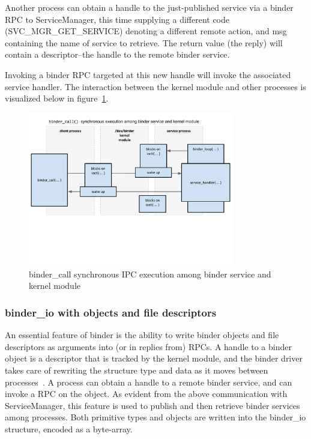 \documentclass[prodmode]{acmlarge}
\begin{document}
Another process can obtain a handle to the just-published service via a binder RPC to ServiceManager, this time supplying a different code (SVC\_MGR\_GET\_SERVICE) denoting a different remote action, and msg containing the name of service to retrieve. The return value (the reply) will contain a descriptor--the handle to the remote binder service.

Invoking a binder RPC targeted at this new handle will invoke the associated service handler. The interaction between the kernel module and other processes is visualized below in figure~\ref{fig:binder_call}.

\begin{figure}[h]
\centering
\includegraphics[width=0.8\textwidth]{drawings/binder_call.pdf}
\caption{binder\_call synchronous IPC execution among binder service and kernel module}
\label{fig:binder_call}
\end{figure}

\subsubsection{binder\_io with objects and file descriptors}
An essential feature of binder is the ability to write binder objects and file descriptors as arguments into (or in replies from) RPCs. A handle to a binder object is a descriptor that is tracked by the kernel module, and the binder driver takes care of rewriting the structure type and data as it moves between processes~\cite{BinderSourceComment}. A process can obtain a handle to a remote binder service, and can invoke a RPC on the object. As evident from the above communication with ServiceManager, this feature is used to publish and then retrieve binder services among processes. Both primitive types and objects are written into the binder\_io structure, encoded as a byte-array.
\end{document}
